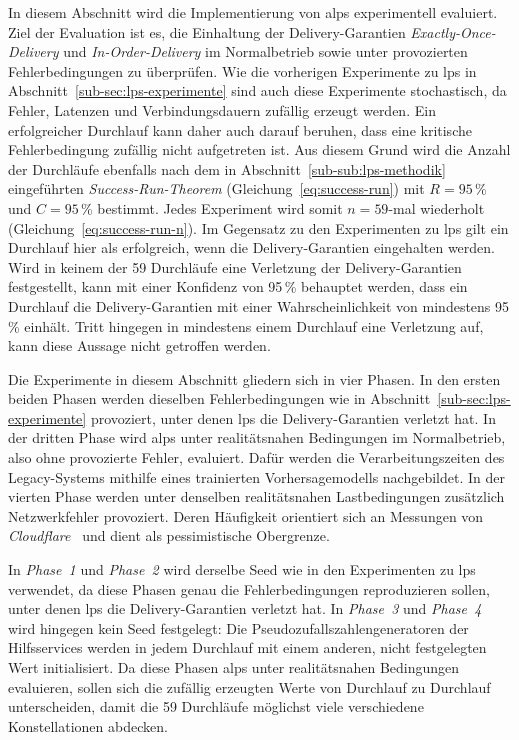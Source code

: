 In diesem Abschnitt wird die Implementierung von \gls{alps} experimentell evaluiert. Ziel der Evaluation ist es, die Einhaltung der Delivery-Garantien \textit{Exactly-Once-Delivery} und \textit{In-Order-Delivery} im Normalbetrieb sowie unter provozierten Fehlerbedingungen zu überprüfen. Wie die vorherigen Experimente zu \gls{lps} in Abschnitt~\ref{sub-sec:lps-experimente} sind auch diese Experimente stochastisch, da Fehler, Latenzen und Verbindungsdauern zufällig erzeugt werden. Ein erfolgreicher Durchlauf kann daher auch darauf beruhen, dass eine kritische Fehlerbedingung zufällig nicht aufgetreten ist. Aus diesem Grund wird die Anzahl der Durchläufe ebenfalls nach dem in Abschnitt~\ref{sub-sub:lps-methodik} eingeführten \textit{Success-Run-Theorem} (Gleichung~\ref{eq:success-run}) mit $R = 95\,\%$ und $C = 95\,\%$ bestimmt. Jedes Experiment wird somit $n = 59$-mal wiederholt (Gleichung~\ref{eq:success-run-n}). Im Gegensatz zu den Experimenten zu \gls{lps} gilt ein Durchlauf hier als erfolgreich, wenn die Delivery-Garantien eingehalten werden. Wird in keinem der 59 Durchläufe eine Verletzung der Delivery-Garantien festgestellt, kann mit einer Konfidenz von 95\,\% behauptet werden, dass ein Durchlauf die Delivery-Garantien mit einer Wahrscheinlichkeit von mindestens 95\,\% einhält. Tritt hingegen in mindestens einem Durchlauf eine Verletzung auf, kann diese Aussage nicht getroffen werden.

\newpage

Die Experimente in diesem Abschnitt gliedern sich in vier Phasen. In den ersten beiden Phasen werden dieselben Fehlerbedingungen wie in Abschnitt~\ref{sub-sec:lps-experimente} provoziert, unter denen \gls{lps} die Delivery-Garantien verletzt hat. In der dritten Phase wird \gls{alps} unter realitätsnahen Bedingungen im Normalbetrieb, also ohne provozierte Fehler, evaluiert. Dafür werden die Verarbeitungszeiten des Legacy-Systems mithilfe eines trainierten Vorhersagemodells nachgebildet. In der vierten Phase werden unter denselben realitätsnahen Lastbedingungen zusätzlich Netzwerkfehler provoziert. Deren Häufigkeit orientiert sich an Messungen von \textit{Cloudflare}~\citep{cloudflare, valenta2024} und dient als pessimistische Obergrenze.

In \textit{Phase~1} und \textit{Phase~2} wird derselbe Seed wie in den Experimenten zu \gls{lps} verwendet, da diese Phasen genau die Fehlerbedingungen reproduzieren sollen, unter denen \gls{lps} die Delivery-Garantien verletzt hat. In \textit{Phase~3} und \textit{Phase~4} wird hingegen kein Seed festgelegt: Die Pseudozufallszahlengeneratoren der Hilfsservices werden in jedem Durchlauf mit einem anderen, nicht festgelegten Wert initialisiert. Da diese Phasen \gls{alps} unter realitätsnahen Bedingungen evaluieren, sollen sich die zufällig erzeugten Werte von Durchlauf zu Durchlauf unterscheiden, damit die 59 Durchläufe möglichst viele verschiedene Konstellationen abdecken.

